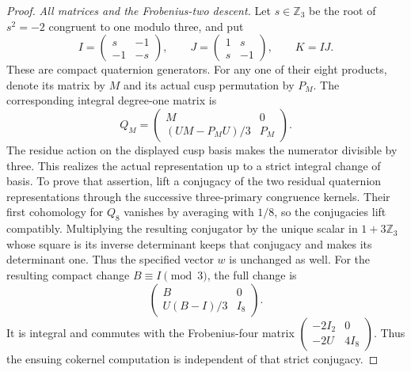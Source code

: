 \begin{proof}
\emph{All matrices and the Frobenius-two descent.}
Let $s\in\mathbb Z_3$ be the root of $s^2=-2$ congruent
to one modulo three, and put
\[
 I=\begin{pmatrix}s&-1\\-1&-s\end{pmatrix},\qquad
 J=\begin{pmatrix}1&s\\s&-1\end{pmatrix},\qquad K=IJ.
                                                               \tag{B.35.14}
\]
These are compact quaternion generators.
For any one of their eight products, denote its matrix
by $M$ and its actual cusp permutation by $P_M$.
The corresponding integral degree-one matrix is
\[
                  Q_M=\begin{pmatrix}
                   M&0\\(UM-P_MU)/3&P_M
                  \end{pmatrix}.                             \tag{B.35.15}
\]
The residue action on the displayed cusp basis makes the
numerator divisible by three.
This realizes the actual representation up to a strict
integral change of basis. To prove that assertion, lift
a conjugacy of the two residual quaternion representations
through the successive three-primary congruence kernels.
Their first cohomology for $Q_8$ vanishes by averaging
with $1/8$, so the conjugacies lift compatibly.
Multiplying the resulting conjugator by the unique scalar
in $1+3\mathbb Z_3$ whose square is its inverse determinant
keeps that conjugacy and makes its determinant one.
Thus the specified vector $w$ is unchanged as well.
For the resulting compact change $B\equiv I\pmod3$, the
full change is
\[
                   \begin{pmatrix}B&0\\U(B-I)/3&I_8\end{pmatrix}.
\]
It is integral and commutes with the Frobenius-four matrix
$\left(\begin{smallmatrix}-2I_2&0\\-2U&4I_8\end{smallmatrix}\right)$.
Thus the ensuing cokernel computation is independent of
that strict conjugacy.


\end{proof}

